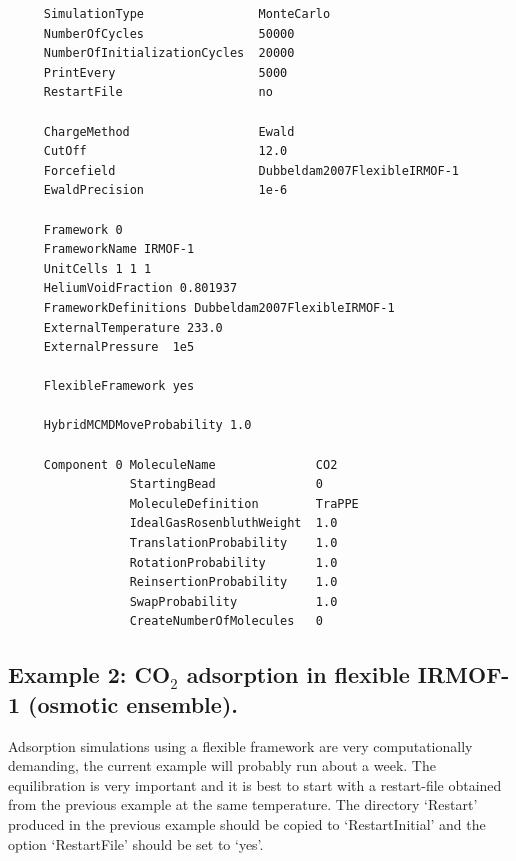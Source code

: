 \begin{tiny}
\begin{verbatim}
     SimulationType                MonteCarlo
     NumberOfCycles                50000
     NumberOfInitializationCycles  20000
     PrintEvery                    5000
     RestartFile                   no
     
     ChargeMethod                  Ewald
     CutOff                        12.0
     Forcefield                    Dubbeldam2007FlexibleIRMOF-1
     EwaldPrecision                1e-6
     
     Framework 0
     FrameworkName IRMOF-1
     UnitCells 1 1 1
     HeliumVoidFraction 0.801937
     FrameworkDefinitions Dubbeldam2007FlexibleIRMOF-1
     ExternalTemperature 233.0
     ExternalPressure  1e5
     
     FlexibleFramework yes
     
     HybridMCMDMoveProbability 1.0
     
     Component 0 MoleculeName              CO2
                 StartingBead              0
                 MoleculeDefinition        TraPPE
                 IdealGasRosenbluthWeight  1.0
                 TranslationProbability    1.0
                 RotationProbability       1.0
                 ReinsertionProbability    1.0
                 SwapProbability           1.0
                 CreateNumberOfMolecules   0
\end{verbatim}
\end{tiny}


\subsection*{Example 2: CO$_2$ adsorption in flexible IRMOF-1 (osmotic ensemble).}

Adsorption simulations using a flexible framework are very computationally demanding, the current example will 
probably run about a week. The equilibration is very important and it is best to start with a restart-file
obtained from the previous example at the same temperature. The directory `Restart' produced in the previous
example should be copied to `RestartInitial' and the option `RestartFile' should be set to `yes'.

